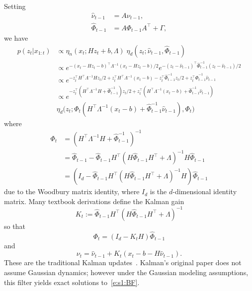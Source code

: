 Setting
\begin{align}
\hat \nu_{t-1} &= A\nu_{t-1} \label{e:s1:hat_nu},\\
\hat \Phi_{t-1} &= A\Phi_{t-1}A^\intercal + \Gamma, \label{e:s1:hat_phi}
\end{align}
we have
\begin{align} 
p(z_t|x_{1:t}) 
&\propto \eta_n(x_t;Hz_t+b,\Lambda)\; \eta_d(z_t;\hat\nu_{t-1},\hat\Phi_{t-1}) \label{e:s1:KF_deriv_start}\\
&\propto e^{-(x_t-Hz_t-b)^\intercal\Lambda^{-1}(x_t-Hz_t-b)/2} e^{-(z_t-\hat\nu_{t-1})^\intercal\hat\Phi_{t-1}^{-1}(z_t-\hat\nu_{t-1})/2} \\
&\propto e^{-z_t^\intercal H^\intercal \Lambda^{-1}Hz_t/2+z_t^\intercal H ^\intercal \Lambda^{-1}(x_t-b)-z_t^\intercal\hat\Phi_{t-1}^{-1} z_t/2 +z_t^\intercal \hat\Phi_{t-1}^{-1}\hat\nu_{t-1}} \\
&\propto e^{-z_t^\intercal (H^\intercal \Lambda^{-1}H + \hat\Phi_{t-1}^{-1})z_t/2+z_t^\intercal (H ^\intercal \Lambda^{-1}(x_t-b)+\hat\Phi_{t-1}^{-1}\hat\nu_{t-1})} \\
&\eta_d\big(z_t; \Phi_t(H ^\intercal \Lambda^{-1}(x_t-b)+\hat\Phi_{t-1}^{-1}\hat\nu_{t-1}), \Phi_t \big)
\end{align}
where
\begin{align}
\Phi_t 
&= (H^\intercal \Lambda^{-1}H + \hat\Phi_{t-1}^{-1})^{-1} \\
&= \hat\Phi_{t-1} - \hat\Phi_{t-1}H^\intercal(H\hat\Phi_{t-1}H^\intercal + \Lambda)^{-1}H\hat\Phi_{t-1} \\
&= (I_d - \hat\Phi_{t-1}H^\intercal(H\hat\Phi_{t-1}H^\intercal + \Lambda)^{-1}H)\hat\Phi_{t-1} \label{e:s1:phit_reln}
\end{align}
due to the Woodbury matrix identity, where $I_d$ is the $d$-dimensional identity matrix.  Many textbook derivations define the Kalman gain
\begin{equation} \label{e:s1:Kalman_gain}
K_t := \hat\Phi_{t-1}H^\intercal(H\hat\Phi_{t-1}H^\intercal + \Lambda)^{-1}
\end{equation}
so that
\begin{equation} \label{e:s1:Kalman_var}
\Phi_t 
= (I_d - K_tH)\hat\Phi_{t-1}
\end{equation}
and
\begin{equation} \label{e:s1:Kalman_mean}
\nu_t = \hat\nu_{t-1} + K_t(x_t -b - H\hat\nu_{t-1}).
\end{equation}
These are the traditional Kalman updates~\cite{Kal60}.  Kalman's original paper does not assume Gaussian dynamics; however under the Gaussian modeling assumptions, this filter yields exact solutions to~\eqref{e:s1:BF}.

